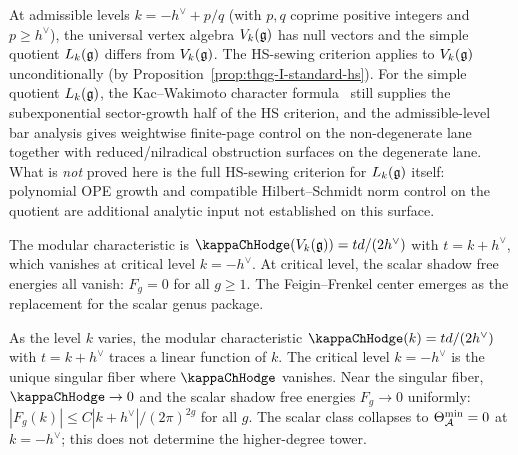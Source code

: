 \begin{remark}
At admissible levels $k = -h^\vee + p/q$ (with $p,q$ coprime positive integers and $p \geq h^\vee$), the universal vertex algebra $V_k(\mathfrak{g})$ has null vectors and the simple quotient $L_k(\mathfrak{g})$ differs from $V_k(\mathfrak{g})$. The HS-sewing criterion applies to $V_k(\mathfrak{g})$ unconditionally (by Proposition~\ref{prop:thqg-I-standard-hs}). For the simple quotient $L_k(\mathfrak{g})$, the Kac--Wakimoto character formula~\cite{KW88} still supplies the subexponential sector-growth half of the HS criterion, and the admissible-level bar analysis gives weightwise finite-page control on the non-degenerate lane together with reduced/nilradical obstruction surfaces on the degenerate lane. What is \emph{not} proved here is the full HS-sewing criterion for $L_k(\mathfrak{g})$ itself: polynomial OPE growth and compatible Hilbert--Schmidt norm control on the quotient are additional analytic input not established on this surface.

The modular characteristic is $\kappaChHodge(V_k(\fg)) = td/(2h^\vee)$ with $t = k + h^\vee$, which vanishes at critical level $k = -h^\vee$. At critical level, the scalar shadow free energies all vanish: $F_g = 0$ for all $g \geq 1$. The Feigin--Frenkel center emerges as the replacement for the scalar genus package.
\end{remark}

\begin{remark}
As the level $k$ varies, the modular characteristic $\kappaChHodge(k) = td/(2h^\vee)$ with $t = k + h^\vee$ traces a linear function of $k$. The critical level $k = -h^\vee$ is the unique singular fiber where $\kappaChHodge$ vanishes. Near the singular fiber, $\kappaChHodge \to 0$ and the scalar shadow free energies $F_g \to 0$ uniformly: $|F_g(k)| \leq C |k + h^\vee| / (2\pi)^{2g}$ for all $g$. The scalar class collapses to $\Theta_{\mathcal{A}}^{\min} = 0$ at $k = -h^\vee$; this does not determine the higher-degree tower.
\end{remark}

